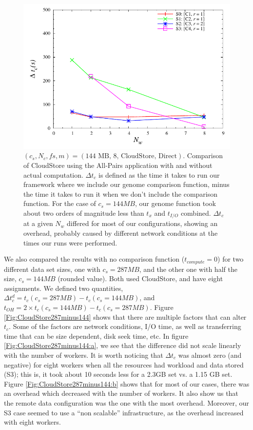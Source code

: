 \documentclass{rspublic}
\begin{document}
\begin{figure}
\begin{center}
\includegraphics[scale=0.5]{data/graphs/CloudStoreComputeMinusNoCompute144}
\caption{$(c_s, N_c, f\!s, m) = (\mbox{144 MB, 8, CloudStore,
Direct})$. Comparison of CloudStore using the All-Pairs application with
and without actual computation. $\Delta t_c$ is defined as the time it
takes to run our framework where we include our genome comparison
function, minus the time it takes to run it when we don't include the
comparison function. For the case of $c_s=144MB$, our genome function
took about two orders of magnitude less than $t_x$ and $t_{I/O}$
combined. $\Delta t_c$ at a given $N_w$ differed for most of our
configurations, showing an overhead, probably caused by different
network conditions at the times our runs were performed.}
\label{Fig:experiment4}
\end{center}
\vspace{-0.3cm}
\end{figure}

We also compared the results with no comparison function
($t_{compute}=0$) for two different data set sizes, one with $c_s =
287MB$, and the other one with half the size, $c_s = 144MB$ (rounded
value). Both used CloudStore, and have eight assignments. We defined two
quantities, $\Delta t_c^d = t_c(c_s = 287MB) - t_c(c_s = 144MB)$, and
$t_{OH} = 2 \times t_c(c_s = 144MB) - t_c(c_s = 287MB)$. Figure
\ref{Fig:CloudStore287minus144} shows that there are multiple factors
that can alter $t_c$. Some of the factors are network conditions, I/O
time, as well as transferring time that can be size dependent, disk seek
time, etc. In figure \ref{Fig:CloudStore287minus144:a}, we see that the
difference did not scale linearly with the number of workers. It is
worth noticing that $\Delta t_c$ was almost zero (and negative) for
eight workers when all the resources had workload and data stored (S3);
this is, it took about 10 seconds less for a 2.3GB set vs. a 1.15 GB
set. Figure \ref{Fig:CloudStore287minus144:b} shows
that for most of our cases, there was an overhead which decreased with
the number of workers. It also show us that the remote data
configuration was the one with the most overhead. Moreover, our S3 case
seemed to use a ``non scalable'' infrastructure, as the overhead
increased with eight workers.
\end{document}
